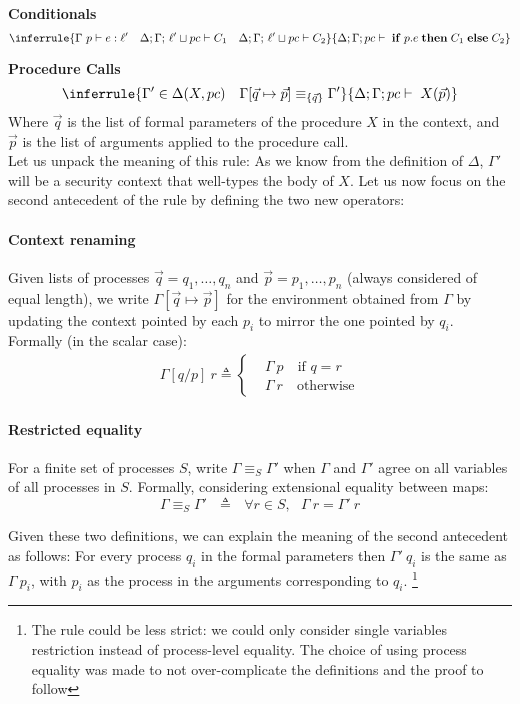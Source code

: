 \documentclass[12pt,a4paper,twoside]{book}
\begin{document}
\medskip
\noindent\textbf{Conditionals}
\[
  \inferrule
  { \Gamma~p \vdash e : \ell'
    \quad
    \Delta;\Gamma;\,\ell' \sqcup pc \vdash C_1
    \quad
    \Delta;\Gamma;\,\ell' \sqcup pc \vdash C_2 }
  {\Delta;\Gamma;pc \vdash \; \mathbf{if}\;p.e\;\mathbf{then}\;C_1\;\mathbf{else}\;C_2}
\]

\medskip
\noindent\textbf{Procedure Calls}
\[
  \inferrule
  { \Gamma' \in \Delta(X,pc) 
    \quad
    \Gamma[\vec{q}\mapsto \vec{p}] \equiv_{\{\vec{q}\}} \Gamma' }
  { \Delta;\Gamma;pc \vdash \; X(\vec{p})}
\]
Where $\vec{q}$ is the list of formal parameters of the procedure $X$ in the context, and $\vec{p}$ is the list of arguments applied to the procedure call.\\
Let us unpack the meaning of this rule:
As we know from the definition of $\Delta$, $\Gamma'$ will be a security context that well-types the body of $X$.
Let us now focus on the second antecedent of the rule by defining the two new operators:
\paragraph{Context renaming}
Given lists of processes $\vec{q} = q_1,\dots,q_n$ and $\vec{p} = p_1,\dots,p_n$ (always considered of equal length), we write
$\Gamma[\vec{q}\mapsto \vec{p}]$
for the environment obtained from $\Gamma$ by updating the context pointed by each $p_i$ to mirror the one pointed by $q_i$. Formally (in the scalar case):
\begin{align*}
	\Gamma[q/p]~r \triangleq
    \begin{cases}
    &\Gamma~p \quad \text{if $q = r$}\\
    &\Gamma~r \quad \text{otherwise}
    \end{cases}
\end{align*}
\paragraph{Restricted equality}
For a finite set of processes $S$, write $\Gamma \equiv_S \Gamma'$ when $\Gamma$ and $\Gamma'$ agree on all variables of all processes in $S$. Formally, considering extensional equality between maps:
$$ \Gamma \equiv_S \Gamma' ~~~\triangleq~~~ \forall r \in S,~~~\Gamma~r = \Gamma'~r$$

Given these two definitions, we can explain the meaning of the second antecedent as follows: For every process $q_i$ in the formal parameters then $\Gamma'~q_i$ is the same as $\Gamma~p_i$, with $p_i$ as the process in the arguments corresponding to $q_i$. \footnote{The rule could be less strict: we could only consider single variables restriction instead of process-level equality. The choice of using process equality was made to not over-complicate the definitions and the proof to follow}
\end{document}
